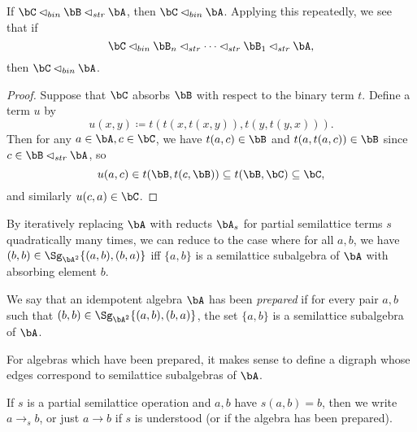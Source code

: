 \begin{prop} If $\bC \lhd_{bin} \bB \lhd_{str} \bA$, then $\bC \lhd_{bin} \bA$. Applying this repeatedly, we see that if
\[
\bC \lhd_{bin} \bB_n \lhd_{str} \cdots \lhd_{str} \bB_1 \lhd_{str} \bA,
\]
then $\bC \lhd_{bin} \bA$.
\end{prop}
\begin{proof} Suppose that $\bC$ absorbs $\bB$ with respect to the binary term $t$. Define a term $u$ by
\[
u(x,y) \coloneqq t(t(x,t(x,y)),t(y,t(y,x))).
\]
Then for any $a \in \bA, c \in \bC$, we have $t(a,c) \in \bB$ and $t(a,t(a,c)) \in \bB$ since $c \in \bB \lhd_{str} \bA$, so
\[
u(a,c) \in t(\bB,t(c,\bB)) \subseteq t(\bB,\bC) \subseteq \bC,
\]
and similarly $u(c,a) \in \bC$.
\end{proof}

By iteratively replacing $\bA$ with reducts $\bA_s$ for partial semilattice terms $s$ quadratically many times, we can reduce to the case where for all $a,b$, we have $(b,b) \in \Sg_{\bA^2}\{(a,b),(b,a)\}$ iff $\{a,b\}$ is a semilattice subalgebra of $\bA$ with absorbing element $b$.

\begin{defn}\label{defn-prepared} We say that an idempotent algebra $\bA$ has been \emph{prepared} if for every pair $a,b$ such that $(b,b) \in \Sg_{\bA^2}\{(a,b),(b,a)\}$, the set $\{a,b\}$ is a semilattice subalgebra of $\bA$.%
\end{defn}

For algebras which have been prepared, it makes sense to define a digraph whose edges correspond to semilattice subalgebras of $\bA$.

\begin{defn} If $s$ is a partial semilattice operation and $a,b$ have $s(a,b) = b$, then we write $a \rightarrow_s b$, or just $a \rightarrow b$ if $s$ is understood (or if the algebra has been prepared).
\end{defn}

